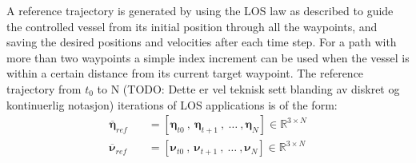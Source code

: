 A reference trajectory is generated by using the LOS law as described to guide the controlled vessel from its initial position through all the waypoints, and
saving the desired positions and velocities after each time step. For a path with more than two waypoints a simple index increment can be used when the
vessel is within a certain distance from its current target waypoint. The reference trajectory from $t_0$ to N (TODO: Dette er vel teknisk sett blanding av diskret og kontinuerlig notasjon) 
iterations of \gls{LOS} applications is of the form:
\begin{subequations}
    \begin{align}
        \overline{\bm{\eta}}_{ref} \quad & = [\bm{\eta}_{t0} \ , \ \bm{\eta}_{t+1} \ , \ \dots \ , \bm{\eta}_N] \in \mathbb{R}^{3 \times N} \\ 
        \overline{\bm{\nu}}_{ref} \quad & = [\bm{\nu}_{t0} \ , \ \bm{\nu}_{t+1} \ , \ \dots \ , \bm{\nu}_N] \in \mathbb{R}^{3 \times N}
    \end{align}
\end{subequations}

